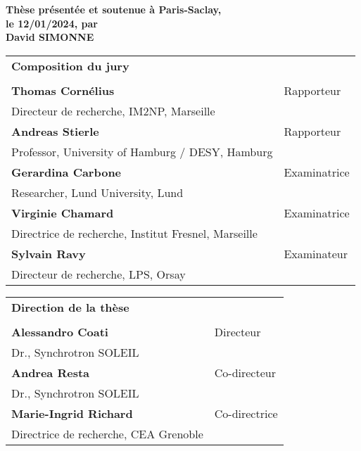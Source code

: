 \begin{titlepage}
\textbf{Thèse présentée et soutenue à Paris-Saclay,\\ le 12/01/2024, par}\\
\bigskip
\Large {\color{Prune} \textbf{David SIMONNE}}

\vspace{\fill} %

\bigskip
\flushleft
\scriptsize
\begin{tabular}{|p{7cm}l}
\arrayrulecolor{Prune}
{\footnotesize \textbf{Composition du jury}}\\
& \\
\textbf{Thomas Cornélius} & Rapporteur \\
Directeur de recherche, IM2NP, Marseille & \\
\textbf{Andreas Stierle} & Rapporteur \\
Professor, University of Hamburg / DESY, Hamburg & \\
\textbf{Gerardina Carbone} & Examinatrice \\
Researcher, Lund University, Lund & \\
\textbf{Virginie Chamard} & Examinatrice \\
Directrice de recherche, Institut Fresnel, Marseille & \\
\textbf{Sylvain Ravy} & Examinateur \\
Directeur de recherche, LPS, Orsay & \\

\end{tabular} 

\medskip
\begin{tabular}{|p{7cm}l}
\arrayrulecolor{Prune}
{\footnotesize \textbf{Direction de la thèse}}\\
& \\
\textbf{Alessandro Coati} & Directeur \\
Dr., Synchrotron SOLEIL & \\
\textbf{Andrea Resta} & Co-directeur \\
Dr., Synchrotron SOLEIL & \\
\textbf{Marie-Ingrid Richard} & Co-directrice \\
Directrice de recherche, CEA Grenoble & \\

\end{tabular} 

\end{titlepage}